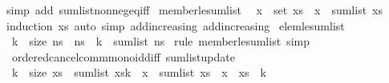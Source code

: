 \begin{isabellebody}
%
\isadelimproof
%
\endisadelimproof
%
\isatagproof
{}\isamarkupfalse%
\ {\isacharparenleft}{\kern0pt}simp\ add{\isacharcolon}{\kern0pt}\ sum{\isacharunderscore}{\kern0pt}list{\isacharunderscore}{\kern0pt}nonneg{\isacharunderscore}{\kern0pt}eq{\isacharunderscore}{\kern0pt}{}{\isacharunderscore}{\kern0pt}iff{\isacharparenright}{\kern0pt}%
\endisatagproof
{\isafoldproof}%
%
\isadelimproof
\isanewline
%
\endisadelimproof
\isanewline
{}\isamarkupfalse%
\ member{\isacharunderscore}{\kern0pt}le{\isacharunderscore}{\kern0pt}sum{\isacharunderscore}{\kern0pt}list{\isacharcolon}{\kern0pt}\isanewline
\ \ {\isachardoublequoteopen}x\ {\isasymin}\ set\ xs\ {\isasymLongrightarrow}\ x\ {\isasymle}\ sum{\isacharunderscore}{\kern0pt}list\ xs{\isachardoublequoteclose}\isanewline
%
\isadelimproof
%
\endisadelimproof
%
\isatagproof
{}\isamarkupfalse%
\ {\isacharparenleft}{\kern0pt}induction\ xs{\isacharparenright}{\kern0pt}\ {\isacharparenleft}{\kern0pt}auto\ simp{\isacharcolon}{\kern0pt}\ add{\isacharunderscore}{\kern0pt}increasing\ add{\isacharunderscore}{\kern0pt}increasing{}{\isacharparenright}{\kern0pt}%
\endisatagproof
{\isafoldproof}%
%
\isadelimproof
\isanewline
%
\endisadelimproof
\isanewline
{}\isamarkupfalse%
\ elem{\isacharunderscore}{\kern0pt}le{\isacharunderscore}{\kern0pt}sum{\isacharunderscore}{\kern0pt}list{\isacharcolon}{\kern0pt}\isanewline
\ \ {\isachardoublequoteopen}k\ {\isacharless}{\kern0pt}\ size\ ns\ {\isasymLongrightarrow}\ ns\ {\isacharbang}{\kern0pt}\ k\ {\isasymle}\ sum{\isacharunderscore}{\kern0pt}list\ {\isacharparenleft}{\kern0pt}ns{\isacharparenright}{\kern0pt}{\isachardoublequoteclose}\isanewline
%
\isadelimproof
%
\endisadelimproof
%
\isatagproof
{}\isamarkupfalse%
\ {\isacharparenleft}{\kern0pt}rule\ member{\isacharunderscore}{\kern0pt}le{\isacharunderscore}{\kern0pt}sum{\isacharunderscore}{\kern0pt}list{\isacharparenright}{\kern0pt}\ simp%
\endisatagproof
{\isafoldproof}%
%
\isadelimproof
\isanewline
%
\endisadelimproof
\isanewline
{}\isamarkupfalse%
\isanewline
\isanewline
{}\isamarkupfalse%
\ {\isacharparenleft}{\kern0pt}\ ordered{\isacharunderscore}{\kern0pt}cancel{\isacharunderscore}{\kern0pt}comm{\isacharunderscore}{\kern0pt}monoid{\isacharunderscore}{\kern0pt}diff{\isacharparenright}{\kern0pt}\ sum{\isacharunderscore}{\kern0pt}list{\isacharunderscore}{\kern0pt}update{\isacharcolon}{\kern0pt}\isanewline
\ \ {\isachardoublequoteopen}k\ {\isacharless}{\kern0pt}\ size\ xs\ {\isasymLongrightarrow}\ sum{\isacharunderscore}{\kern0pt}list\ {\isacharparenleft}{\kern0pt}xs{\isacharbrackleft}{\kern0pt}k\ {\isacharcolon}{\kern0pt}{\isacharequal}{\kern0pt}\ x{\isacharbrackright}{\kern0pt}{\isacharparenright}{\kern0pt}\ {\isacharequal}{\kern0pt}\ sum{\isacharunderscore}{\kern0pt}list\ xs\ {\isacharplus}{\kern0pt}\ x\ {\isacharminus}{\kern0pt}\ xs\ {\isacharbang}{\kern0pt}\ k{\isachardoublequoteclose}\isanewline

\end{isabellebody}
